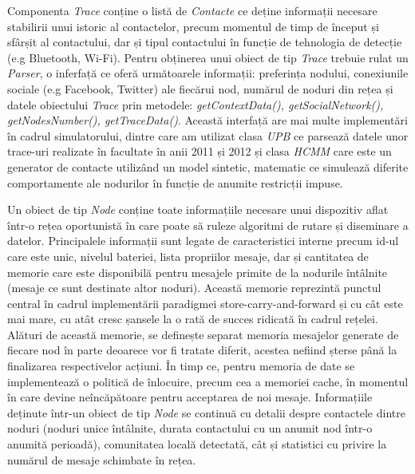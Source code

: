 \documentclass[12pt,a4paper]{report}
\begin{document}
Componenta \textit{Trace} conține o listă de \textit{Contacte} ce deține informații necesare stabilirii unui istoric al contactelor, precum momentul de timp de început și sfârșit al contactului, dar și tipul contactului în funcție de tehnologia de detecție (e.g Bluetooth, Wi-Fi). Pentru obținerea unui obiect de tip \textit{Trace} trebuie rulat un \textit{Parser}, o inferfață ce oferă următoarele informații: preferința nodului, conexiunile sociale (e.g Facebook, Twitter) ale fiecărui nod, numărul de noduri din rețea și datele obiectului \textit{Trace} prin metodele: \textit{getContextData(), getSocialNetwork(), getNodesNumber(), getTraceData()}. Această interfață are mai multe implementări în cadrul simulatorului, dintre care am utilizat clasa \textit{UPB} ce parsează datele unor trace-uri realizate în facultate în anii 2011 și 2012 și clasa \textit{HCMM} care este un generator de contacte utilizând un model sintetic, matematic ce simulează diferite comportamente ale nodurilor în funcție de anumite restricții impuse.

Un obiect de tip \textit{Node} conține toate informațiile necesare unui dispozitiv aflat într-o rețea oportunistă în care poate să ruleze algoritmi de rutare și diseminare a datelor. Principalele informații sunt legate de caracteristici interne precum id-ul care este unic, nivelul bateriei, lista propriilor mesaje, dar și cantitatea de memorie care este disponibilă pentru mesajele primite de la nodurile întâlnite (mesaje ce sunt destinate altor noduri). Această memorie reprezintă punctul central în cadrul implementării paradigmei store-carry-and-forward și cu cât este mai mare, cu atât cresc șansele la o rată de succes ridicată în cadrul rețelei. Alături de această memorie, se definește separat memoria mesajelor generate de fiecare nod în parte deoarece vor fi tratate diferit, acestea nefiind șterse până la finalizarea respectivelor acțiuni. În timp ce, pentru memoria de date se implementează o politică de înlocuire, precum cea a memoriei cache, în momentul în care devine neîncăpătoare pentru acceptarea de noi mesaje. 
Informațiile deținute într-un obiect de tip \textit{Node} se continuă cu detalii despre contactele dintre noduri (noduri unice întâlnite, durata contactului cu un anumit nod într-o anumită perioadă), comunitatea locală detectată, cât și statistici cu privire la numărul de mesaje schimbate în rețea. 
\end{document}
